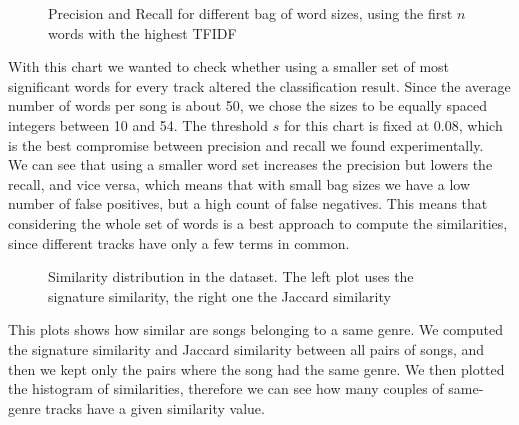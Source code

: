 \documentclass[a4paper, 11pt]{article} %
\begin{document}
\begin{figure}[H]
\centering
\noindent{}
\caption{Precision and Recall for different bag of word sizes, using the first $n$ words with the highest TFIDF}
\label{fig:b}
\end{figure}
With this chart we wanted to check whether using a smaller set of most significant words for every track altered the classification result. Since the average number of words per song is about 50, we chose the sizes to be equally spaced integers between 10 and 54. The threshold $s$ for this chart is fixed at $0.08$, which is the best compromise between precision and recall we found experimentally.\\
We can see that using a smaller word set increases the precision but lowers the recall, and vice versa, which means that with small bag sizes we have a low number of false positives, but a high count of false negatives. This means that considering the whole set of words is a best approach to compute the similarities, since different tracks have only a few terms in common.


\begin{figure}[H]
\centering
\noindent{}
\caption{Similarity distribution in the dataset. The left plot uses the signature similarity, the right one the Jaccard similarity}
\label{fig:ef}
\end{figure}
This plots shows how similar are songs belonging to a same genre. We computed the signature similarity and Jaccard similarity between all pairs of songs, and then we kept only the pairs where the song had the same genre. We then plotted the histogram of similarities, therefore we can see how many couples of same-genre tracks have a given similarity value.
\end{document}

